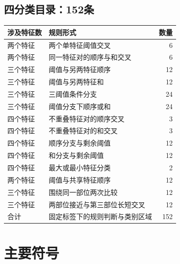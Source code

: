 \documentclass[11pt,a4paper]{article}
\numberwithin{equation}{section}
\begin{document}
\subsection{四分类目录：152条}
{\small
\begin{longtable}{L{2.6cm}L{11.1cm}r}
\toprule
涉及特征数 & 规则形式 & 数量\\
\midrule\endhead
两个特征 & 两个单特征阈值交叉 & 6\\
两个特征 & 同一特征对的顺序与和交叉 & 6\\
三个特征 & 阈值与另两特征顺序 & 12\\
三个特征 & 阈值与另两特征和 & 12\\
三个特征 & 三阈值条件分支 & 24\\
三个特征 & 阈值分支下顺序或和 & 24\\
四个特征 & 不重叠特征对的顺序交叉 & 3\\
四个特征 & 不重叠特征对的和交叉 & 3\\
四个特征 & 顺序分支与剩余阈值 & 12\\
四个特征 & 和分支与剩余阈值 & 12\\
四个特征 & 最大或最小特征分类 & 2\\
两个特征 & 阈值与共享特征顺序 & 12\\
三个特征 & 围绕同一部位两次比较 & 12\\
三个特征 & 两部位接近与第三部位长短交叉 & 12\\
\midrule
合计 & 固定标签下的规则判断与类别区域 & 152\\
\bottomrule
\end{longtable}}

\section{主要符号}
\label{app:symbols}
\end{document}
